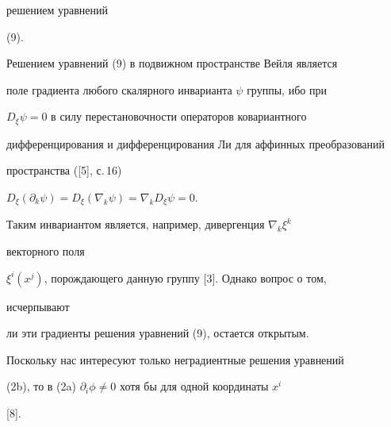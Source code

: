 решением уравнений 


(9). 


 


\begin{note} 


Решением уравнений (9) в подвижном пространстве Вейля является 


поле градиента любого скалярного инварианта $\psi$ группы, ибо при


$D_\xi\psi=0$ в силу перестановочности операторов ковариантного 


дифференцирования и дифференцирования Ли для аффинных преобразований 


пространства ([5], с.\,16) 


$D_\xi(\partial_k\psi)=D_\xi(\nabla_k\psi)=\nabla_k D_\xi\psi=0$. 


Таким инвариантом является, например, дивергенция $\nabla_k\xi^k$ 


векторного поля 


$\xi^i(x^j)$, порождающего данную группу [3]. Однако вопрос о том, 


исчерпывают 


ли эти градиенты решения уравнений (9), остается открытым. 


\end{note} 


 


\begin{note} 


Поскольку нас интересуют только неградиентные решения уравнений 


(2b), то в (2a) $\partial_i\phi\ne0$ хотя бы для одной координаты $x^i$ 


[8]. 


\end{note} 


 


